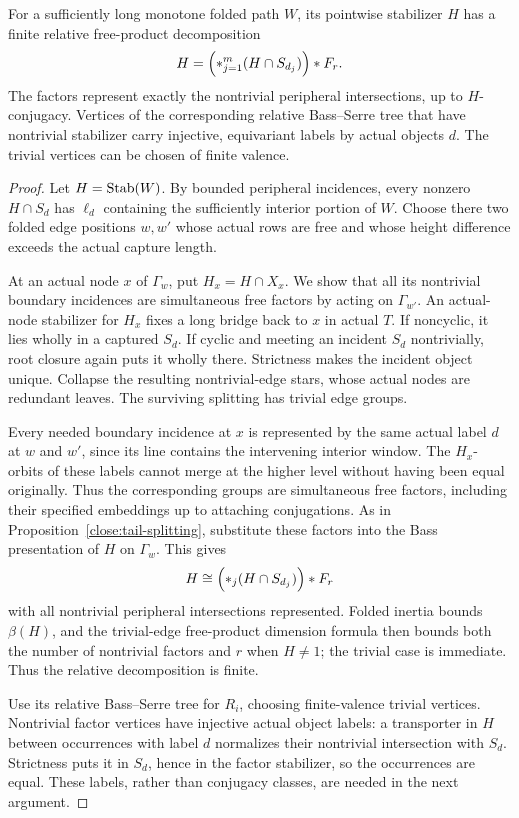\begin{proposition}\label{transfer:window-splitting}
For a sufficiently long monotone folded path \(W\), its pointwise stabilizer \(H\) has a finite relative free-product decomposition
\[
 H=\Bigl(*_{j=1}^m(H\cap S_{d_j})\Bigr)*F_r.
\]
The factors represent exactly the nontrivial peripheral intersections, up to \(H\)-conjugacy. Vertices of the corresponding relative Bass--Serre tree that have nontrivial stabilizer carry injective, equivariant labels by actual objects \(d\). The trivial vertices can be chosen of finite valence.
\end{proposition}
\begin{proof}
Let $H=\operatorname{Stab}(W)$. By bounded peripheral incidences, every nonzero
$H\cap S_d$ has $\ell_d$ containing the sufficiently interior
portion of $W$. Choose there two folded edge positions $w,w'$ whose
actual rows are free and whose height difference exceeds the actual
capture length.

At an actual node $x$ of $\Gamma_w$, put $H_x=H\cap X_x$. We show
that all its nontrivial boundary incidences are simultaneous free
factors by acting on $\Gamma_{w'}$. An actual-node stabilizer for
$H_x$ fixes a long bridge back to $x$ in actual $T$. If noncyclic,
it lies wholly in a captured $S_d$. If cyclic and meeting an
incident $S_d$ nontrivially, root closure again puts it wholly
there. Strictness makes the incident object unique. Collapse the
resulting nontrivial-edge stars, whose actual nodes are redundant
leaves. The surviving splitting has trivial edge groups.

Every needed boundary incidence at $x$ is represented by the same
actual label $d$ at $w$ and $w'$, since its line contains the
intervening interior window. The $H_x$-orbits of these labels cannot
merge at the higher level without having been equal originally.
Thus the corresponding groups are simultaneous free factors,
including their specified embeddings up to attaching conjugations.
As in Proposition~\ref{close:tail-splitting}, substitute these
factors into the Bass presentation of $H$ on $\Gamma_w$. This gives
\[
 H\cong\Bigl(*_j(H\cap S_{d_j})\Bigr)*F_r
\]
with all nontrivial peripheral intersections represented. Folded
inertia bounds $\beta(H)$, and the trivial-edge free-product
dimension formula then bounds both the number of nontrivial factors
and $r$ when $H\ne1$; the trivial case is immediate. Thus the
relative decomposition is finite.

Use its relative Bass--Serre tree for $R_i$, choosing finite-valence
trivial vertices. Nontrivial factor vertices have injective actual
object labels: a transporter in $H$ between occurrences with label
$d$ normalizes their nontrivial intersection with $S_d$. Strictness
puts it in $S_d$, hence in the factor stabilizer, so the occurrences
are equal. These labels, rather than conjugacy classes, are needed
in the next argument.


\end{proof}
